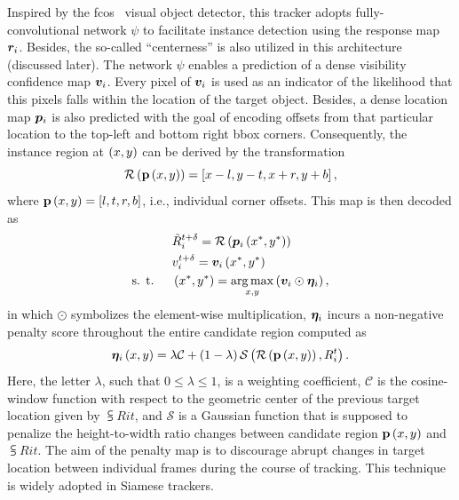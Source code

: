 Inspired by the \gls{fcos}~\cite{tian2019fcos} visual object detector, this tracker adopts fully-convolutional network $\psi$ to facilitate instance detection using the response map $\bm{r}_{i}$. Besides, the so-called ``centerness'' is also utilized in this architecture (discussed later). The network $\psi$ enables a prediction of a dense visibility confidence map $\bm{v}_{i}$. Every pixel of $\bm{v}_{i}$ is used as an indicator of the likelihood that this pixels falls within the location of the target object. Besides, a dense location map $\bm{p}_{i}$ is also predicted with the goal of encoding offsets from that particular location to the top-left and bottom right \gls{bbox} corners. Consequently, the instance region at $\left( {x, y} \right)$ can be derived by the transformation
\begin{equation}
    {\mathcal{R}} \left( {\mathbf{p}} \left( x, y \right) \right) =
    \left[ {x - l, y - t, x + r, y + b} \right],
\end{equation}
where ${\mathbf{p}} \left( x, y \right) = \left[ {l, t, r, b} \right]$, i.e., individual corner offsets. This map is then decoded as
\begin{equation}
    \begin{aligned}
                            & {\tilde{R}}_{i}^{t + \delta} =
        {\mathcal{R}} \left( {\bm{p}_{i}} \left( x^*, y^* \right) \right)                                                                      \\
                            & {v}_{i}^{t + \delta} = {\bm{v}_{i}} \left( x^*, y^* \right)                                        \\
        \text{s. t. } \quad & \left( {x^*, y^*} \right) = \underset{x, y}{\operatorname*{arg\,max}} \left( {\bm{v}_{i} \odot \bm{\eta}_{i}} \right),
    \end{aligned}
\end{equation}
in which $\odot$ symbolizes the element-wise multiplication, $\bm{\eta}_{i}$ incurs a non-negative penalty score throughout the entire candidate region computed as
\begin{equation}
    {\bm{\eta}_{i}} \left( x, y \right) =
    \lambda \mathcal{C} +
    \left( {1 - \lambda} \right) {\mathcal{S}} \left( 
        {\mathcal{R}} \left( 
            {\mathbf{p}} \left( x, y \right)
         \right),
        {R}_{i}^{t}
     \right).
\end{equation}
Here, the letter $\lambda$, such that $0 \leq \lambda \leq 1$, is a weighting coefficient, $\mathcal{C}$ is the cosine-window function with respect to the geometric center of the previous target location given by $\subsup{R}{i}{t}$, and $\mathcal{S}$ is a Gaussian function that is supposed to penalize the height-to-width ratio changes between candidate region ${\mathbf{p}} \left( x, y \right)$ and $\subsup{R}{i}{t}$. The aim of the penalty map is to discourage abrupt changes in target location between individual frames during the course of tracking. This technique is widely adopted in Siamese trackers.

